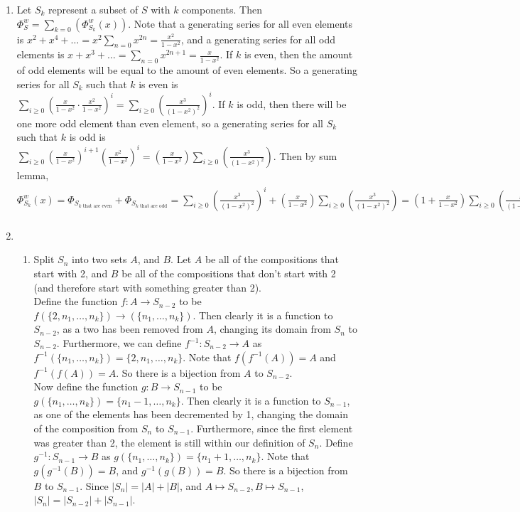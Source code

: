 \documentclass[10pt,english]{article}
\begin{document}
\begin{enumerate}
\pagebreak
\item Let $S_k$ represent a subset of $S$ with $k$ components. Then $\Phi_S^w=\sum_{k=0}(\Phi_{S_k}^w(x))$. Note that a generating series for all even elements is $x^2+x^4+\ldots=x^2\sum_{n=0}x^{2n}=\frac{x^2}{1-x^2}$, and a generating series for all odd elements is $x+x^3+\ldots=\sum_{n=0}x^{2n+1}=\frac{x}{1-x^2}$. If $k$ is even, then the amount of odd elements will be equal to the amount of even elements.  So a generating series for all $S_k$ such that $k$ is even is $\sum_{i\geq0}\left(\frac{x}{1-x^2}\cdot\frac{x^2}{1-x^2}\right)^i=\sum_{i\geq0}\left(\frac{x^3}{(1-x^2)^2}\right)^i$. If $k$ is odd, then there will be one more odd element than even element, so a generating series for all $S_k$ such that $k$ is odd is $\sum_{i\geq0}\left(\frac{x}{1-x^2}\right)^{i+1}\left(\frac{x^2}{1-x^2}\right)^i=\left(\frac{x}{1-x^2}\right)\sum_{i\geq0}\left(\frac{x^3}{(1-x^2)^2}\right)$. Then by sum lemma, $\Phi_{S_k}^w(x)=\Phi_{S_{k\text{ that are even}}}+\Phi_{S_{k\text{ that are odd}}}=\sum_{i\geq0}\left(\frac{x^3}{(1-x^2)^2}\right)^i+\left(\frac{x}{1-x^2}\right)\sum_{i\geq0}\left(\frac{x^3}{(1-x^2)^2}\right)=\left(1+\frac{x}{1-x^2}\right)\sum_{i\geq0}\left(\frac{x^3}{(1-x^2)^2}\right)^i=\left(1+\frac{x}{1-x^2}\right)\left(\frac{1}{1-\left(\frac{x^3}{(1-x^2)^2}\right)}\right)=\left(1+\frac{x}{1-x^2}\right)\left(\frac{(1-x^2)^2}{(-x^2+1)^2-x^3}\right)=\frac{(-x^2+x+1)(-x^2+1)}{(-x^2+1)^2-x^3}$

\pagebreak
\item \begin{enumerate}
    \item Split $S_n$ into two sets $A$, and $B$. Let $A$ be all of the compositions that start with 2, and $B$ be all of the compositions that don't start with 2 (and therefore start with something greater than 2). \\ 
Define the function $f:A\rightarrow S_{n-2}$ to be $f(\{2,n_1,\ldots,n_k\})\rightarrow(\{n_1,\ldots,n_k\})$. Then clearly it is a function to $S_{n-2}$, as a two has been removed from $A$, changing its domain from $S_n$ to $S_{n-2}$. Furthermore, we can define $f^{-1}:S_{n-2}\rightarrow A$ as $f^{-1}(\{n_1,\ldots,n_k\})=\{2,n_1,\ldots,n_k\}$. Note that $f(f^{-1}(A))=A$ and $f^{-1}(f(A))=A$. So there is a bijection from $A$ to $S_{n-2}$. \\ 
Now define the function $g:B\rightarrow S_{n-1}$ to be $g(\{n_1,\ldots,n_k\})=\{n_1-1,\ldots,n_k\}$. Then clearly it is a function to $S_{n-1}$, as one of the elements has been decremented by 1, changing the domain of the composition from $S_n$ to $S_{n-1}$. Furthermore, since the first element was greater than 2, the element is still within our definition of $S_n$. Define $g^{-1}:S_{n-1}\rightarrow B$ as $g(\{n_1,\ldots,n_k\})=\{n_1+1,\ldots,n_k\}$. Note that $g(g^{-1}(B))=B$, and $g^{-1}(g(B))=B$. So there is a bijection from $B$ to $S_{n-1}$. 
Since $|S_n|=|A|+|B|$, and $A\mapsto S_{n-2}, B\mapsto S_{n-1}$, $|S_n|=|S_{n-2}|+|S_{n-1}|$.


\end{enumerate}
\end{enumerate}
\end{document}
